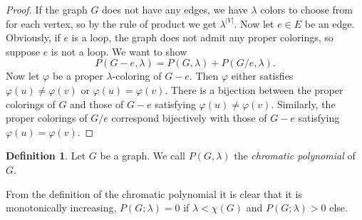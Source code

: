 \documentclass[12pt,a4paper, twoside, autooneside=false]{scrartcl}
\theoremstyle{definition}
\newtheorem{definition}[theorem]{Definition}
\theoremstyle{remark}
\numberwithin{equation}{section}
\begin{document}
\begin{proof}
If the graph $G$ does not have any edges, we have $\lambda$ colors to choose from for each vertex, so by the rule of product we get $\lambda^{|V|}$. Now let $e \in E$ be an edge. Obviously, if $e$ is a loop, the graph does not admit any proper colorings, so suppose $e$ is not a loop. We want to show 
\[
P(G - e, \lambda) = P(G, \lambda) + P(G/e, \lambda).
\]
Now let $\varphi$ be a proper $\lambda$-coloring of $G - e$. Then $\varphi$ either satisfies $\varphi(u) \neq \varphi(v)$ or $\varphi(u) = \varphi(v)$. There is a bijection between the proper colorings of $G$ and those of $G - e$ satisfying $\varphi(u) \neq \varphi(v)$. Similarly, the proper colorings of $G / e$ correspond bijectively with those of $G - e$ satisfying $\varphi(u) = \varphi(v)$.
\end{proof}
\begin{definition} Let $G$ be a graph. We call $P(G, \lambda)$ the \textit{chromatic polynomial} of $G$. 
\end{definition}
From the definition of the chromatic polynomial it is clear that it is monotonically increasing, $P(G; \lambda) = 0$ if $\lambda < \chi(G)$ and $P(G;\lambda) > 0$ else. 
\end{document}
